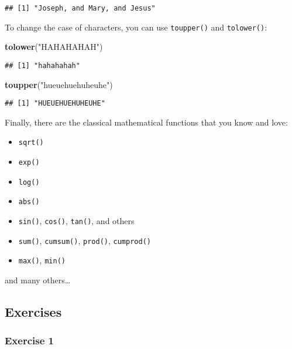 \documentclass[
]{article}
\newenvironment{Shaded}{\begin{snugshade}}{\end{snugshade}}
\newcommand{\KeywordTok}[1]{\textcolor[rgb]{0.13,0.29,0.53}{\textbf{#1}}}
\newcommand{\NormalTok}[1]{#1}
\newcommand{\StringTok}[1]{\textcolor[rgb]{0.31,0.60,0.02}{#1}}
\providecommand{\tightlist}{%
  \setlength{\itemsep}{0pt}\setlength{\parskip}{0pt}}
\begin{document}
\begin{verbatim}
## [1] "Joseph, and Mary, and Jesus"
\end{verbatim}

To change the case of characters, you can use \texttt{toupper()} and \texttt{tolower()}:

\begin{Shaded}
\begin{Highlighting}[]
\KeywordTok{tolower}\NormalTok{(}\StringTok{"HAHAHAHAH"}\NormalTok{)}
\end{Highlighting}
\end{Shaded}

\begin{verbatim}
## [1] "hahahahah"
\end{verbatim}

\begin{Shaded}
\begin{Highlighting}[]
\KeywordTok{toupper}\NormalTok{(}\StringTok{"hueuehuehuheuhe"}\NormalTok{)}
\end{Highlighting}
\end{Shaded}

\begin{verbatim}
## [1] "HUEUEHUEHUHEUHE"
\end{verbatim}

Finally, there are the classical mathematical functions that you know and love:

\begin{itemize}
\tightlist
\item
  \texttt{sqrt()}
\item
  \texttt{exp()}
\item
  \texttt{log()}
\item
  \texttt{abs()}
\item
  \texttt{sin()}, \texttt{cos()}, \texttt{tan()}, and others
\item
  \texttt{sum()}, \texttt{cumsum()}, \texttt{prod()}, \texttt{cumprod()}
\item
  \texttt{max()}, \texttt{min()}
\end{itemize}

and many others\ldots{}

\hypertarget{exercises-1}{%
\subsection{Exercises}\label{exercises-1}}

\hypertarget{exercise-1-1}{%
\subsubsection*{Exercise 1}\label{exercise-1-1}}
\end{document}
